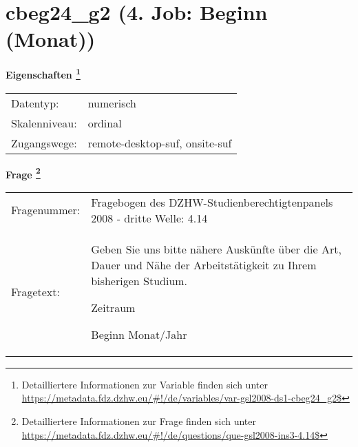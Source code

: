 
    \setcounter{footnote}{0}

    \vspace*{-1.8cm}
	\section{cbeg24\_g2 (4. Job: Beginn (Monat))}
	\label{section:cbeg24_g2}



    \vspace*{0.5cm}
    \noindent\textbf{Eigenschaften
	\footnote{Detailliertere Informationen zur Variable finden sich unter
		\url{https://metadata.fdz.dzhw.eu/\#!/de/variables/var-gsl2008-ds1-cbeg24_g2$}}}\\
	\begin{tabularx}{\hsize}{@{}lX}
	Datentyp: & numerisch \\
	Skalenniveau: & ordinal \\
	Zugangswege: &
	  remote-desktop-suf, 
	  onsite-suf
 \\
    \end{tabularx}



				\vspace*{0.5cm}
                \noindent\textbf{Frage
	                \footnote{Detailliertere Informationen zur Frage finden sich unter
		              \url{https://metadata.fdz.dzhw.eu/\#!/de/questions/que-gsl2008-ins3-4.14$}}}\\
				\begin{tabularx}{\hsize}{@{}lX}
					Fragenummer: &
					  Fragebogen des DZHW-Studienberechtigtenpanels 2008 - dritte Welle:
					  4.14
 \\
					Fragetext: & Geben Sie uns bitte nähere Auskünfte über die Art, Dauer und Nähe der Arbeitstätigkeit zu Ihrem bisherigen Studium.\par  Zeitraum\par  Beginn Monat/Jahr \\
				\end{tabularx}





